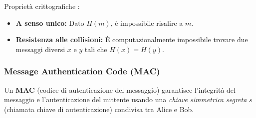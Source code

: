 Proprietà crittografiche :
\begin{itemize}
    \item \textbf{A senso unico:} Dato $H(m)$, è impossibile risalire a $m$.
    \item \textbf{Resistenza alle collisioni:} È computazionalmente impossibile trovare due messaggi diversi $x$ e $y$ tali che $H(x) = H(y)$.
\end{itemize}

\subsubsection{Message Authentication Code (MAC)}
Un \textbf{MAC} (codice di autenticazione del messaggio) garantisce l'integrità del messaggio e l'autenticazione del mittente usando una \textit{chiave simmetrica segreta} $s$ (chiamata chiave di autenticazione) condivisa tra Alice e Bob.

